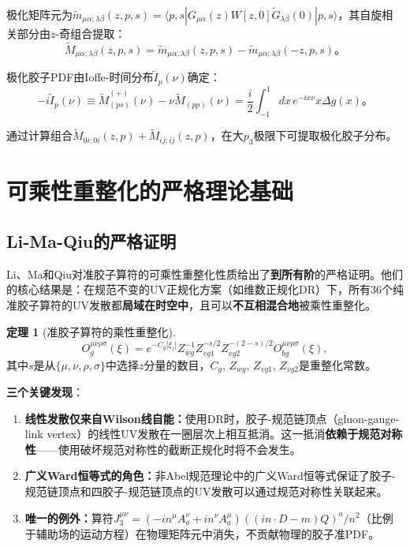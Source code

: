 \documentclass[12pt,a4paper]{ctexart}
\theoremstyle{definition}
\newtheorem{theorem}{定理}[section]
\begin{document}
极化矩阵元为$\tilde{m}_{\mu\alpha;\lambda\beta}(z,p,s) = \langle p,s| G_{\mu\alpha}(z) W[z,0] \tilde{G}_{\lambda\beta}(0) |p,s\rangle$，其自旋相关部分由$z$-奇组合提取\cite{Egerer2022}：
\begin{equation}
\tilde{M}_{\mu\alpha;\lambda\beta}(z,p,s) = \tilde{m}_{\mu\alpha;\lambda\beta}(z,p,s) - \tilde{m}_{\mu\alpha;\lambda\beta}(-z,p,s)。
\end{equation}

极化胶子PDF由Ioffe-时间分布$\tilde{I}_p(\nu)$确定\cite{Egerer2022}：
\begin{equation}
-i\tilde{I}_p(\nu) \equiv \tilde{M}_{(ps)}^{(+)}(\nu) - \nu \tilde{M}_{(pp)}(\nu) = \frac{i}{2} \int_{-1}^{1} dx\, e^{-ix\nu} x \Delta g(x)。
\end{equation}

通过计算组合$\tilde{M}_{0i;0i}(z,p) + \tilde{M}_{ij;ij}(z,p)$，在大$p_3$极限下可提取极化胶子分布。

\section{可乘性重整化的严格理论基础}

\subsection{Li-Ma-Qiu的严格证明}

Li、Ma和Qiu\cite{Li2018multiplicative}对准胶子算符的可乘性重整化性质给出了\textbf{到所有阶}的严格证明。他们的核心结果是：在规范不变的UV正规化方案（如维数正规化DR）下，所有36个纯准胶子算符的UV发散都\textbf{局域在时空中}，且可以\textbf{不互相混合地}被乘性重整化\cite{Li2018multiplicative}。

\begin{theorem}[准胶子算符的乘性重整化]\cite{Li2018multiplicative}
\begin{equation}
O^{\mu\nu\rho\sigma}_g(\xi) = e^{-C_g|\xi_z|} Z^{-1}_{wg} Z^{-s/2}_{vg1} Z^{-(2-s)/2}_{vg2} O^{\mu\nu\rho\sigma}_{bg}(\xi),
\label{eq:multiplicative_renorm}
\end{equation}
其中$s$是从$\{\mu,\nu,\rho,\sigma\}$中选择$z$分量的数目，$C_g$, $Z_{wg}$, $Z_{vg1}$, $Z_{vg2}$是重整化常数。
\end{theorem}

\textbf{三个关键发现}\cite{Li2018multiplicative}：
\begin{enumerate}
    \item \textbf{线性发散仅来自Wilson线自能：}使用DR时，胶子-规范链顶点（gluon-gauge-link vertex）的线性UV发散在一圈层次上相互抵消。这一抵消\textbf{依赖于规范对称性}——使用破坏规范对称性的截断正规化时将不会发生。
    \item \textbf{广义Ward恒等式的角色：}非Abel规范理论中的广义Ward恒等式保证了胶子-规范链顶点和四胶子-规范链顶点的UV发散可以通过规范对称性关联起来。
    \item \textbf{唯一的例外：}算符$J^{\mu\nu}_3 = (-in^\mu A^\nu_a + in^\nu A^\mu_a)((in\cdot D - m)Q)^a/n^2$（比例于辅助场的运动方程）在物理矩阵元中消失，不贡献物理的胶子准PDF。
\end{enumerate}
\end{document}
